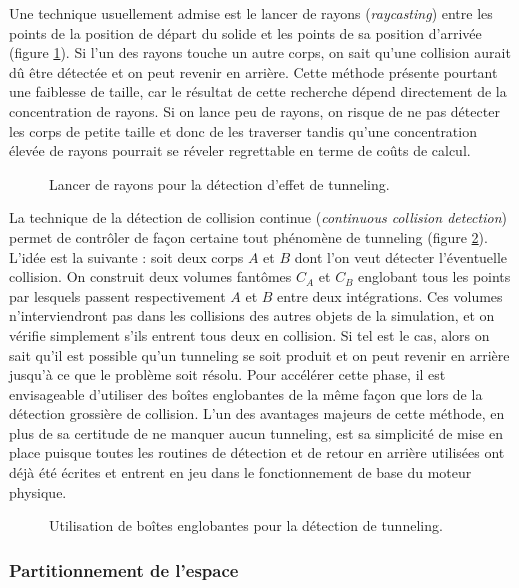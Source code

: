Une technique usuellement admise est le lancer de rayons
(\textit{raycasting}) entre les points de la position de départ du
solide et les points de sa position d'arrivée (figure
\ref{tunneling2}). Si l'un des rayons touche un autre corps, on sait
qu'une collision aurait dû être détectée et on peut revenir en
arrière. Cette méthode présente pourtant une faiblesse de taille, car
le résultat de cette recherche dépend directement de la concentration
de rayons. Si on lance peu de rayons, on risque de ne pas détecter les
corps de petite taille et donc de les traverser tandis qu'une
concentration élevée de rayons pourrait se réveler regrettable en
terme de coûts de calcul.

\begin{figure}
  \centering
  
  \caption{Lancer de rayons pour la détection d'effet de tunneling.}
  \label{tunneling2}
\end{figure}

La technique de la détection de collision continue (\textit{continuous
  collision detection}) permet de contrôler de façon certaine tout
phénomène de tunneling (figure \ref{tunneling3}). L'idée est la
suivante : soit deux corps $A$ et $B$ dont l'on veut détecter
l'éventuelle collision. On construit deux volumes fantômes $C_A$ et
$C_B$ englobant tous les points par lesquels passent respectivement
$A$ et $B$ entre deux intégrations. Ces volumes n'interviendront pas
dans les collisions des autres objets de la simulation, et on vérifie
simplement s'ils entrent tous deux en collision. Si tel est le cas,
alors on sait qu'il est possible qu'un tunneling se soit produit et on
peut revenir en arrière jusqu'à ce que le problème soit résolu. Pour
accélérer cette phase, il est envisageable d'utiliser des boîtes
englobantes de la même façon que lors de la détection grossière de
collision. L'un des avantages majeurs de cette méthode, en plus de sa
certitude de ne manquer aucun tunneling, est sa simplicité de mise en
place puisque toutes les routines de détection et de retour en arrière
utilisées ont déjà été écrites et entrent en jeu dans le
fonctionnement de base du moteur physique.

\begin{figure}[h]
  \centering
  
  \caption{Utilisation de boîtes englobantes pour la détection de tunneling.}
  \label{tunneling3}
\end{figure}

\subsubsection{Partitionnement de l'espace}

